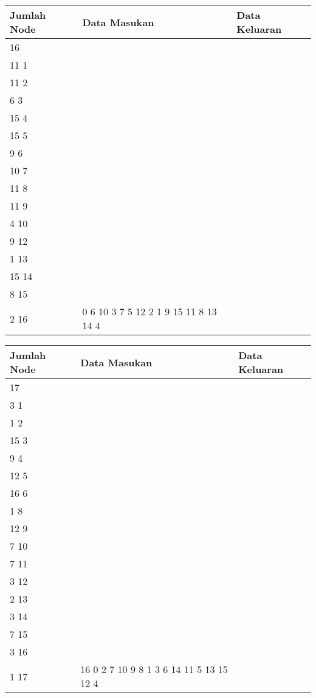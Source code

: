 	\begin{longtable}[Ht]{| p{} | p{} | p{} |}
		\hline
		Jumlah Node & Data Masukan                                                                                                                                                                                                                          & Data Keluaran                                                          \\ \hline
	16          & \begin{tabular}[c]{@{}l@{}}16\\ 11 1\\ 11 2\\ 6 3\\ 15 4\\ 15 5\\ 9 6\\ 10 7\\ 11 8\\ 11 9\\ 4 10\\ 9 12\\ 1 13\\ 15 14\\ 8 15\\ 2 16\end{tabular}                                                                                    & 0 6 10 3 7 5 12 2 1 9 15 11 8 13 14 4                                  \\ \hline
	\end{longtable}
	\pagebreak
	\begin{longtable}[Ht]{| p{} | p{} | p{} |}
		\hline
		Jumlah Node & Data Masukan                                                                                                                                                                                                                          & Data Keluaran                                                          \\ \hline
	17          & \begin{tabular}[c]{@{}l@{}}17\\ 3 1\\ 1 2\\ 15 3\\ 9 4\\ 12 5\\ 16 6\\ 1 8\\ 12 9\\ 7 10\\ 7 11\\ 3 12\\ 2 13\\ 3 14\\ 7 15\\ 3 16\\ 1 17\end{tabular}                                                                                & 16 0 2 7 10 9 8 1 3 6 14 11 5 13 15 12 4                               \\ \hline
	\end{longtable}
